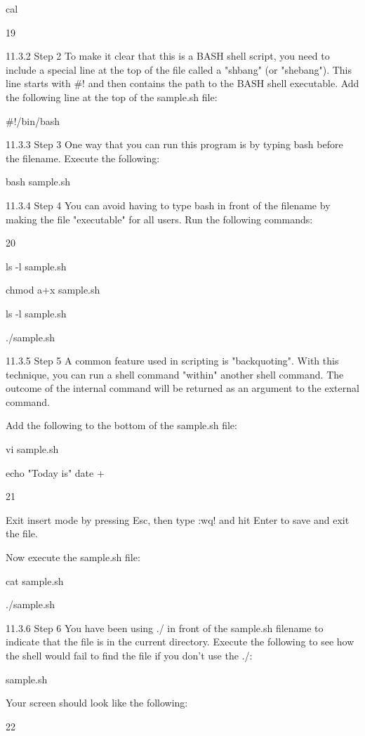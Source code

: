 cal

19



11.3.2 Step 2
To make it clear that this is a BASH shell script, you need to include a special line at the top of
the file called a "shbang" (or "shebang"). This line starts with #! and then contains the path to the
BASH shell executable. Add the following line at the top of the sample.sh file:

#!/bin/bash

11.3.3 Step 3
One way that you can run this program is by typing bash before the filename. Execute the
following:

bash sample.sh

11.3.4 Step 4
You can avoid having to type bash in front of the filename by making the file "executable" for all
users. Run the following commands:

20



ls -l sample.sh

chmod a+x sample.sh

ls -l sample.sh

./sample.sh

11.3.5 Step 5
A common feature used in scripting is "backquoting". With this technique, you can run a shell
command "within" another shell command. The outcome of the internal command will be
returned as an argument to the external command.

Add the following to the bottom of the sample.sh file:

vi sample.sh

echo "Today is" date +%

21



Exit insert mode by pressing Esc, then type :wq! and hit Enter to save and exit the file.

Now execute the sample.sh file:

cat sample.sh

./sample.sh

11.3.6 Step 6
You have been using ./ in front of the sample.sh filename to indicate that the file is in the
current directory. Execute the following to see how the shell would fail to find the file if you don't
use the ./:

sample.sh

Your screen should look like the following:

22




